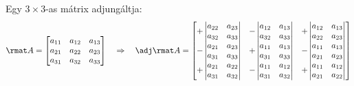 \documentclass[a4paper, 12pt]{scrartcl}
\begin{document}
\begin{blueBox}
  Egy $3 \times 3$-as mátrix adjungáltja:
  $$
    \rmat A = \begin{bmatrix}
      a_{11} & a_{12} & a_{13} \\
      a_{21} & a_{22} & a_{23} \\
      a_{31} & a_{32} & a_{33}
    \end{bmatrix}
    \quad
    \Rightarrow
    \quad
    \adj \rmat A = \begin{bmatrix}
      + \begin{vmatrix}
          a_{22} & a_{23} \\
          a_{32} & a_{33}
        \end{vmatrix}
       &
      - \begin{vmatrix}
          a_{12} & a_{13} \\
          a_{32} & a_{33}
        \end{vmatrix}
       &
      +\begin{vmatrix}
         a_{12} & a_{13} \\
         a_{22} & a_{23}
       \end{vmatrix}
      \\
      - \begin{vmatrix}
          a_{21} & a_{23} \\
          a_{31} & a_{33}
        \end{vmatrix}
       &
      + \begin{vmatrix}
          a_{11} & a_{13} \\
          a_{31} & a_{33}
        \end{vmatrix}
       &
      - \begin{vmatrix}
          a_{11} & a_{13} \\
          a_{21} & a_{23}
        \end{vmatrix}
      \\
      + \begin{vmatrix}
          a_{21} & a_{22} \\
          a_{31} & a_{32}
        \end{vmatrix}
       &
      - \begin{vmatrix}
          a_{11} & a_{12} \\
          a_{31} & a_{32}
        \end{vmatrix}
       &
      +\begin{vmatrix}
         a_{11} & a_{12} \\
         a_{21} & a_{22}
       \end{vmatrix}
    \end{bmatrix}
  $$
\end{blueBox}
\end{document}
